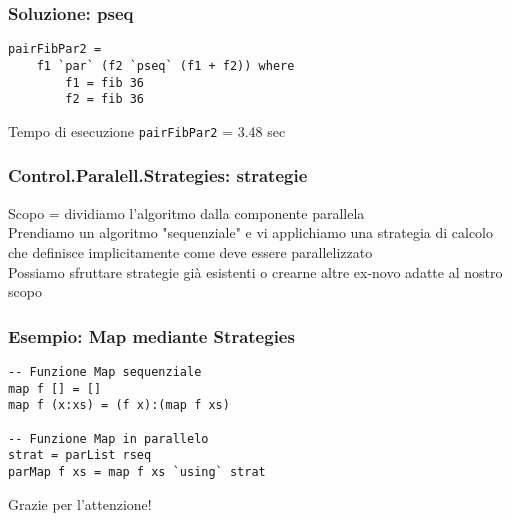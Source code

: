 \documentclass[14pt]{beamer}
\begin{document}

\begin{frame}[fragile]
\frametitle{Soluzione: pseq}
\begin{verbatim}
pairFibPar2 =
    f1 `par` (f2 `pseq` (f1 + f2)) where
        f1 = fib 36
        f2 = fib 36
\end{verbatim}
Tempo di esecuzione \texttt{pairFibPar2} = 3.48 sec\\[2ex]
\end{frame}


\begin{frame}[fragile]
\frametitle{Control.Paralell.Strategies: strategie}
Scopo = dividiamo l'algoritmo dalla componente parallela\\[2ex]
Prendiamo un algoritmo "sequenziale" e vi applichiamo una strategia di calcolo che definisce implicitamente come deve essere parallelizzato \\[2ex]
Possiamo sfruttare strategie già esistenti o crearne altre ex-novo adatte al nostro scopo
\end{frame}


\begin{frame}[fragile]
\frametitle{Esempio: Map mediante Strategies}
\begin{verbatim}
-- Funzione Map sequenziale
map f [] = []
map f (x:xs) = (f x):(map f xs)

-- Funzione Map in parallelo
strat = parList rseq
parMap f xs = map f xs `using` strat
\end{verbatim}
\end{frame}

\begin{frame}
\Huge{\centerline{Grazie per l'attenzione!}}
\end{frame}

\end{document}
